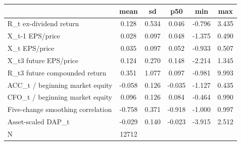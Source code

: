 {
\def\sym#1{\ifmmode^{#1}\else\(^{#1}\)\fi}
\begin{tabular}{l*{1}{ccccc}}
\hline\hline
                    &        mean&          sd&         p50&         min&         max\\
\hline
R\_t ex-dividend return&       0.128&       0.534&       0.046&      -0.796&       3.435\\
X\_t-1 EPS/price     &       0.028&       0.097&       0.048&      -1.375&       0.490\\
X\_t EPS/price       &       0.035&       0.097&       0.052&      -0.933&       0.507\\
X\_t3 future EPS/price&       0.124&       0.270&       0.148&      -2.214&       1.345\\
R\_t3 future compounded return&       0.351&       1.077&       0.097&      -0.981&       9.993\\
ACC\_t / beginning market equity&      -0.058&       0.126&      -0.035&      -1.127&       0.435\\
CFO\_t / beginning market equity&       0.096&       0.126&       0.084&      -0.464&       0.990\\
Five-change smoothing correlation&      -0.758&       0.371&      -0.918&      -1.000&       0.997\\
Asset-scaled DAP\_t  &      -0.029&       0.140&      -0.023&      -3.915&       2.512\\
\hline
N                   &       12712&            &            &            &            \\
\hline\hline
\end{tabular}
}

